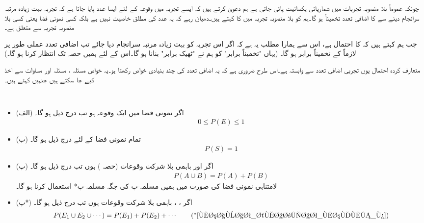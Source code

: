 چونکہ عموماً بلا منصوبہ تجربات میں شماریاتی یکسانیت پائی جاتی ہے ہم  دعویٰ کرتے ہیں کہ ایسے تجربہ میں وقوعہ  کے لئے ایسا عدد  پایا جاتا ہے کہ تجربہ بہت زیادہ مرتبہ سرانجام دینے سے   کا اضافی تعدد تخمیناً  ہو گا۔ہم  کو  بلا منصوبہ تجربہ میں  کا  کہتے ہیں۔دھیان رہے کہ یہ عدد  کی مطلق خاصیت نہیں ہے بلکہ کسی نمونی فضا  یعنی کسی بلا منصوبہ تجربہ سے متعلق ہے۔

جب ہم کہتے ہیں کہ  کا احتمال  ہے، اس سے ہمارا مطلب یہ ہے کہ اگر اس تجربہ کو بہت زیادہ مرتبہ سرانجام دیا جائے تب اضافی تعدد   عملی طور پر لازماً  کے تخمیناً برابر ہو گا۔ (یہاں "تخمیناً برابر"  کو ہم نے "ٹھیک برابر" بنانا ہو گا۔اس کے لئے ہمیں حصہ  تک  انتظار کرنا ہو گا۔)

متعارف کردہ احتمال یوں تجربی اضافی تعدد  سے وابستہ ہے۔اس طرح ضروری ہے کہ یہ اضافی تعدد کی چند بنیادی خواص رکھتا ہو۔یہ خواص مسئلہ ، مسئلہ  اور مساوات   سے اخذ کیے جا سکتے ہیں جنہیں  کہتے ہیں۔

\\
\begin{itemize}
\item{(الف)}
اگر نمونی فضا  میں  ایک وقوعہ ہو تب درج ذیل ہو گا۔
\begin{align}\label{مساوات_شماریات_مسلمہ_الف}
0\le P(E)\le 1
\end{align}
%
\item{(ب)}
تمام نمونی فضا کے لئے درج ذیل ہو گا۔
\begin{align}\label{مساوات_شماریات_مسلمہ_ب}
P(S)=1
\end{align}
%
\item{(پ)}
اگر   اور  باہمی بلا شرکت وقوعات (حصہ ) ہوں تب درج ذیل ہو گا۔
\begin{align}\label{مساوات_شماریات_مسلمہ_پ}
P(A\cup B)=P(A)+P(B)
\end{align}
%
لامتناہی نمونی فضا کی صورت میں ہمیں مسلمہ-پ کی جگہ مسلمہ-پ*  استعمال کرنا ہو گا۔
\item{(پ*)}
اگر ، ،  باہمی بلا شرکت وقوعات ہوں تب درج ذیل ہو گا۔
\begin{align*}
P(E_1\cup E_2 \cup\cdots)=P(E_1)+P(E_2)+\cdots  \tag{$^*$\ref{مساوات_شماریات_مسلمہ_پ}}
\end{align*}
\end{itemize}

